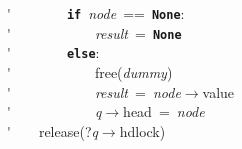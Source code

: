 \'\>~~~~~~~~\texttt{\textbf{if}}~\textit{node}~==~\texttt{\textbf{None}}:\\

\'\>~~~~~~~~~~~~\textit{result}~=~\texttt{\textbf{None}}\\

\'\>~~~~~~~~\texttt{\textbf{else}}:\\

\'\>~~~~~~~~~~~~free(\textit{dummy})\\

\'\>~~~~~~~~~~~~\textit{result}~=~\textit{node}$\rightarrow$value\\

\'\>~~~~~~~~~~~~\textit{q}$\rightarrow$head~=~\textit{node}\\

\'\>~~~~release(?\textit{q}$\rightarrow$hdlock)